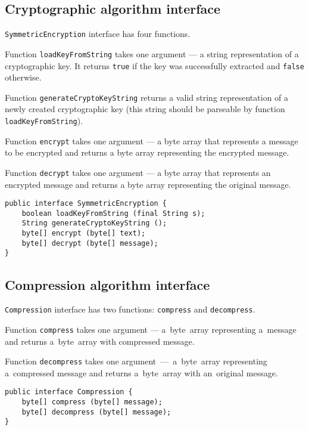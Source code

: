 \subsection{Cryptographic algorithm interface}
\texttt{SymmetricEncryption} interface has four functions.

Function \texttt{loadKeyFromString} takes one argument --- 
a string representation of a cryptographic key. It returns
\texttt{true} if the key was successfully extracted and
\texttt{false} otherwise.

Function \texttt{generateCryptoKeyString} returns a 
valid string representation of a newly created cryptographic key 
(this string should be parseable by function \texttt{loadKeyFromString}).

Function \texttt{encrypt} takes one argument --- a byte array that represents
a message to be encrypted and returns a byte array representing the encrypted
message.

Function \texttt{decrypt} takes one argument --- a byte array that represents
an encrypted message and returns a byte array representing the original message.

\begin{lstlisting}
public interface SymmetricEncryption {
    boolean loadKeyFromString (final String s);
    String generateCryptoKeyString ();
    byte[] encrypt (byte[] text);
    byte[] decrypt (byte[] message);
}
\end{lstlisting}

\subsection{Compression algorithm interface}

\texttt{Compression} interface has two functions:
\texttt{compress} and \texttt{decompress}. 

Function \texttt{compress}
takes one argument --- a~byte~array representing a~message and returns
a~byte~array with compressed message. 

Function \texttt{decompress}
takes one argument~---~a~byte~array representing a~compressed message
and returns a~byte~array with an~original message.

\begin{lstlisting} 
public interface Compression {
    byte[] compress (byte[] message);
    byte[] decompress (byte[] message);
}
\end{lstlisting}
